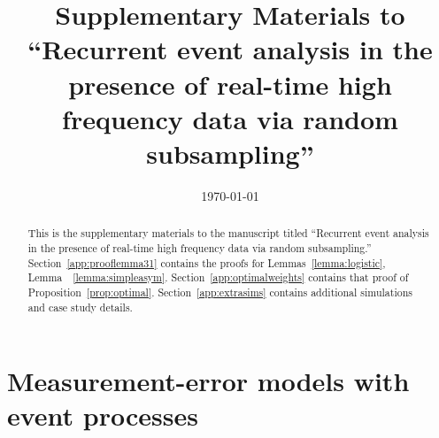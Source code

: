 \documentclass[12pt]{amsart}
\begin{document}
\title[Supplement to ``Recurrent event analysis with functional covariates via random subsampling'']{Supplementary Materials to ``Recurrent event analysis in the presence of real-time high frequency data via random subsampling''}

\date{\today}

\begin{abstract}
This is the supplementary materials to the manuscript titled ``Recurrent event analysis in the presence of real-time high frequency data via random subsampling.''  Section~\ref{app:prooflemma31} contains the proofs for Lemmas~\ref{lemma:logistic}, Lemma~~\ref{lemma:simpleasym}.  Section~\ref{app:optimalweights} contains that proof of Proposition~\ref{prop:optimal}.
Section~\ref{app:extrasims} contains additional simulations and case study details.
\end{abstract}


\maketitle

\appendix

\section{Measurement-error models with event processes}
\label{section:memproblems}
\end{document}
